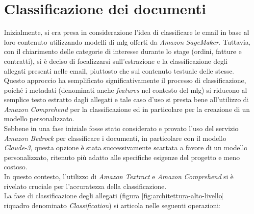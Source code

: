 \section{Classificazione dei documenti}
\label{sec:classificazione-documenti}
Inizialmente, si era presa in considerazione l'idea di classificare le email in base al loro contenuto utilizzando modelli di \gls{mlg} offerti da \emph{Amazon SageMaker}. Tuttavia, con il chiarimento delle categorie di interesse durante lo stage (ordini, fatture e contratti), si è deciso di focalizzarsi sull'estrazione e la classificazione degli allegati presenti nelle email, piuttosto che sul contenuto testuale delle stesse. Questo approccio ha semplificato significativamente il processo di classificazione, poiché i metadati (denominati anche \textit{features} nel contesto del \gls{mlg}) si riducono al semplice testo estratto dagli allegati e tale caso d'uso si presta bene all'utilizzo di \emph{Amazon Comprehend} per la classificazione ed in particolare per la creazione di un modello personalizzato.\\
Sebbene in una fase iniziale fosse stato considerato e provato l'uso del servizio \emph{Amazon Bedrock} per classificare i documenti, in particolare con il modello \emph{Claude-3}, questa opzione è stata successivamente scartata a favore di un modello personalizzato, ritenuto più adatto alle specifiche esigenze del progetto e meno costoso.\\
In questo contesto, l'utilizzo di \emph{Amazon Textract} e \emph{Amazon Comprehend} si è rivelato cruciale per l'accuratezza della classificazione.\\
La fase di classificazione degli allegati (figura \ref{fig:architettura-alto-livello} riquadro denominato \emph{Classification}) si articola nelle seguenti operazioni:

